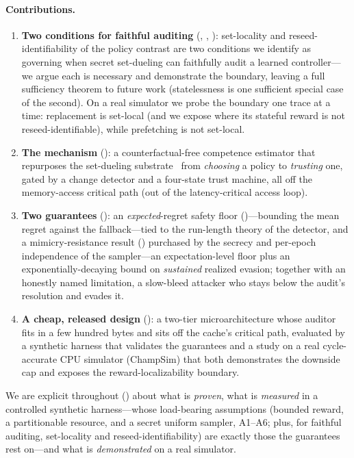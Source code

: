 \documentclass{article}
\begin{document}
\paragraph{Contributions.}
\begin{enumerate}
\item \textbf{Two conditions for faithful auditing} (, ,
): set-locality and reseed-identifiability of the policy contrast
are two conditions we identify as governing when secret set-dueling can faithfully audit a
learned controller---we argue each is necessary and demonstrate the boundary, leaving a full
sufficiency theorem to future work (statelessness is one sufficient special case of the second). On a
real simulator we probe the boundary one trace at a time: replacement is set-local
(and we expose where its stateful reward is not reseed-identifiable), while
prefetching is not set-local.
\item \textbf{The mechanism} (): a counterfactual-free competence
estimator that repurposes the set-dueling substrate~\citep{qureshi2007dip,jaleel2010rrip}
from \emph{choosing} a policy to \emph{trusting} one, gated by a change detector and a
four-state trust machine, all off the memory-access critical path (out of the
latency-critical access loop).
\item \textbf{Two guarantees} (): an \emph{expected}-regret safety floor
()---bounding the mean regret against the fallback---tied to the run-length theory
of the detector, and a mimicry-resistance result () purchased by
the secrecy and per-epoch independence of the sampler---an expectation-level floor
plus an exponentially-decaying bound on \emph{sustained} realized evasion; together
with an honestly named limitation, a slow-bleed attacker who stays below the audit's
resolution and evades it.
\item \textbf{A cheap, released design} (): a two-tier
microarchitecture whose auditor fits in a few hundred bytes and sits off the cache's
critical path, evaluated by a synthetic harness that validates the guarantees and a
study on a real cycle-accurate CPU simulator (ChampSim) that both demonstrates the
downside cap and exposes the reward-localizability boundary.
\end{enumerate}
\noindent We are explicit throughout () about what is
\emph{proven}, what is \emph{measured} in a controlled synthetic harness---whose
load-bearing assumptions (bounded reward, a partitionable resource, and a secret uniform
sampler, A1--A6; plus, for faithful auditing, set-locality and reseed-identifiability) are
exactly those the guarantees rest on---and what is \emph{demonstrated} on a real simulator.
\end{document}
